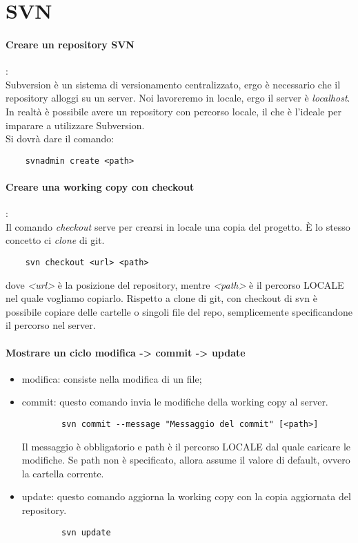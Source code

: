 \documentclass[a4paper]{article}
\begin{document}
	
	\section{SVN}
	
	\paragraph{Creare un repository SVN}: \\
	Subversion è un sistema di versionamento centralizzato, ergo è necessario che il repository alloggi su un server. Noi lavoreremo in locale, ergo il server è \textit{localhost}. In realtà è possibile avere un repository con percorso locale, il che è l'ideale per imparare a utilizzare Subversion.\\
	Si dovrà dare il comando:
	\begin{verbatim}
	svnadmin create <path>
	\end{verbatim}
	
	\paragraph{Creare una working copy con checkout}:\\
	Il comando \textit{checkout} serve per crearsi in locale una copia del progetto. È lo stesso concetto ci \textit{clone} di git.
	\begin{verbatim}
	svn checkout <url> <path>
	\end{verbatim}
	dove \textit{<url>} è la posizione del repository, mentre \textit{<path>} è il percorso LOCALE nel quale vogliamo copiarlo.
	Rispetto a clone di git, con checkout di svn è possibile copiare delle cartelle o singoli file del repo, semplicemente specificandone il percorso nel server.
	
	\paragraph{Mostrare un ciclo modifica -> commit -> update}
	\begin{itemize}
		\item modifica: consiste nella modifica di un file;
		\item commit: questo comando invia le modifiche della working copy al server.\begin{verbatim}
		svn commit --message "Messaggio del commit" [<path>]
		\end{verbatim}
		Il messaggio è obbligatorio e path è il percorso LOCALE dal quale caricare le modifiche. Se path non è specificato, allora assume il valore di default, ovvero la cartella corrente.
		\item update: questo comando aggiorna la working copy con la copia aggiornata del repository.
		\begin{verbatim}
		svn update
		\end{verbatim}
	\end{itemize}
	
\end{document}
